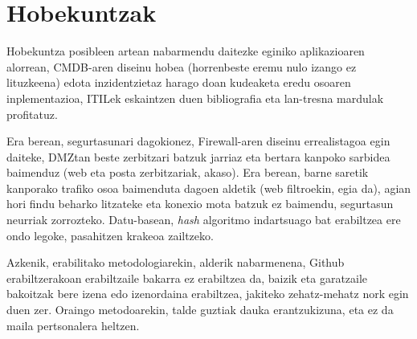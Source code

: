 \section{Hobekuntzak}
Hobekuntza posibleen artean nabarmendu daitezke eginiko aplikazioaren alorrean, CMDB-aren diseinu hobea (horrenbeste eremu nulo izango ez lituzkeena) edota inzidentzietaz harago doan kudeaketa eredu osoaren inplementazioa, ITILek eskaintzen duen bibliografia eta lan-tresna mardulak profitatuz.

Era berean, segurtasunari dagokionez, Firewall-aren diseinu errealistagoa egin daiteke, DMZtan beste zerbitzari batzuk jarriaz eta bertara kanpoko sarbidea baimenduz (web eta posta zerbitzariak, akaso). Era berean, barne saretik kanporako trafiko osoa baimenduta dagoen aldetik (web filtroekin, egia da), agian hori findu beharko litzateke eta konexio mota batzuk ez baimendu, segurtasun neurriak zorrozteko. Datu-basean, \textit{hash} algoritmo indartsuago bat erabiltzea ere ondo legoke, pasahitzen krakeoa zailtzeko.

Azkenik, erabilitako metodologiarekin, alderik nabarmenena, Github erabiltzerakoan erabiltzaile bakarra ez erabiltzea da, baizik eta garatzaile bakoitzak bere izena edo izenordaina erabiltzea, jakiteko zehatz-mehatz nork egin duen zer. Oraingo metodoarekin, talde guztiak dauka erantzukizuna, eta ez da maila pertsonalera heltzen.
